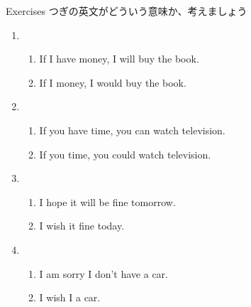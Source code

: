 \documentclass[aspectratio=169,xcolor={dvipsnames,table}]{beamer}
\begin{document}
\begin{frame}[plain]{Exercises}
 つぎの英文がどういう意味か、考えましょう


\begin{enumerate}
 \item \begin{enumerate}
	\item If I have money, I will buy the book. 
	\item If I  money, I would buy the book.
       \end{enumerate}
 \item \begin{enumerate}
	\item If you have time, you can watch television.
	\item If you  time, you could watch television.
       \end{enumerate}
 \item \begin{enumerate}
	\item I hope it will be fine tomorrow.
	\item I wish it  fine today.
       \end{enumerate}
 \item \begin{enumerate}
	\item I am sorry I don't have a car.
	\item I wish I  a car.
       \end{enumerate}
\end{enumerate}
\end{frame}
\end{document}
